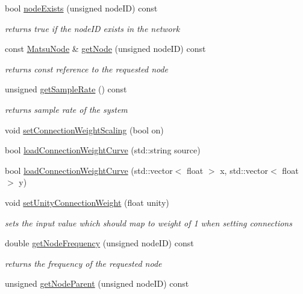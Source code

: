 \begin{DoxyCompactItemize}
bool \hyperlink{classMatsuokaEngine_ab768643e41c3801b2d734b7432dc1a4c}{node\+Exists} (unsigned node\+ID) const 
\begin{DoxyCompactList}\small\item\em returns true if the node\+ID exists in the network \end{DoxyCompactList}\item 
const \hyperlink{classMatsuNode}{Matsu\+Node} \& \hyperlink{classMatsuokaEngine_ae0dfa755bb0a0c5d4d1c78e22c498ee1}{get\+Node} (unsigned node\+ID) const 
\begin{DoxyCompactList}\small\item\em returns const reference to the requested node \end{DoxyCompactList}\item 
unsigned \hyperlink{classMatsuokaEngine_a486763527331bfc9ccd617b312d6c611}{get\+Sample\+Rate} () const 
\begin{DoxyCompactList}\small\item\em returns sample rate of the system \end{DoxyCompactList}\item 
void \hyperlink{classMatsuokaEngine_adb864bf26563682f94ba2e131fb8b793}{set\+Connection\+Weight\+Scaling} (bool on)
\item 
bool \hyperlink{classMatsuokaEngine_ae2ad27d38196e2217bdb0b5da35fd095}{load\+Connection\+Weight\+Curve} (std\+::string source)
\item 
bool \hyperlink{classMatsuokaEngine_ad05eb51876bee90334426757a981139b}{load\+Connection\+Weight\+Curve} (std\+::vector$<$ float $>$ x, std\+::vector$<$ float $>$ y)
\item 
void \hyperlink{classMatsuokaEngine_aa7254e0141ad5763ff6267a8430b30ab}{set\+Unity\+Connection\+Weight} (float unity)
\begin{DoxyCompactList}\small\item\em sets the input value which should map to weight of 1 when setting connections \end{DoxyCompactList}\item 
double \hyperlink{classMatsuokaEngine_a620e21099810accc4c7e40f37020f444}{get\+Node\+Frequency} (unsigned node\+ID) const 
\begin{DoxyCompactList}\small\item\em returns the frequency of the requested node \end{DoxyCompactList}\item 
unsigned \hyperlink{classMatsuokaEngine_a6aeab33df18150b97190ff502881960e}{get\+Node\+Parent} (unsigned node\+ID) const 

\end{DoxyCompactItemize}
